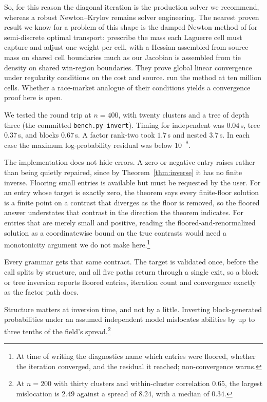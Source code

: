 \documentclass[11pt]{article}
\begin{document}
So, for this reason the diagonal iteration
is the production solver we recommend, whereas a robust Newton--Krylov remains solver
engineering. The nearest
proven result we know for a problem of this shape is the damped Newton
method of \citet{kitagawa2019} for semi-discrete optimal transport:
prescribe the mass each Laguerre cell must capture and adjust one
weight per cell, with a Hessian assembled from source mass on shared
cell boundaries much as our Jacobian is assembled from tie density on
shared win-region boundaries. They prove global linear convergence
under regularity conditions on the cost and source.
\citet{levy2021} run the method at ten million cells. Whether a
race-market analogue of their conditions yields a convergence proof
here is open.

We tested the round trip at $n=400$, with twenty
clusters and a tree of depth three (the committed \texttt{bench.py
invert}). Timing for independent was $0.04$\,s, tree $0.37$\,s, and blocks $0.67$\,s. A factor
rank-two took $1.7$\,s and nested $3.7$\,s. In each case the maximum log-probability residual was below $10^{-8}$.

The implementation does not hide errors. A zero or negative entry raises
rather than being quietly repaired, since by Theorem~\ref{thm:inverse} it
has no finite inverse. Flooring small entries is available but must be
requested by the user. For an entry whose target is exactly zero, the
theorem says every finite-floor solution is a finite point on a contrast
that diverges as the floor is removed, so the floored answer understates
that contrast in the direction the theorem indicates. For entries that
are merely small and positive, reading the floored-and-renormalized
solution as a coordinatewise bound on the true contrasts would need a
monotonicity argument we do not make here.\footnote{At time of writing
the diagnostics name which entries were floored, whether the iteration
converged, and the residual it reached; non-convergence warns.}

Every grammar gets that same contract. The target is validated once,
before the call splits by structure, and all five paths return through a
single exit, so a block or tree inversion reports floored entries,
iteration count and convergence exactly as the factor path does.

Structure matters at inversion time, and not by a little. Inverting
block-generated probabilities under an assumed independent model
mislocates abilities by up to three tenths of the field's spread.\footnote{At
$n=200$ with thirty clusters and within-cluster correlation $0.65$, the
largest mislocation is $2.49$ against a spread of $8.24$, with a median
of $0.34$.}
\end{document}
